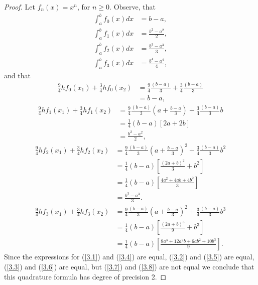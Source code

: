 \documentclass[8pt]{article}
\theoremstyle{definition}
\begin{document}
\begin{proof}
Let $f_n (x) = x^n$, for $n \geq 0$. Observe, that 
\begin{align}
\int_{a}^{b} f_0 (x) dx &= b - a, \label{3.1} \\
\int_{a}^{b} f_1 (x) dx &= \frac{b^2 - a^2}{2}, \label{3.2} \\
\int_{a}^{b} f_2 (x) dx &= \frac{b^3 - a^3}{3}, \label{3.3} \\
\int_{a}^{b} f_3 (x) dx &= \frac{b^4 - a^4}{4}, \label{3.7}
\end{align}
and that
\begin{align}
\nonumber \frac{9}{4} h f_0(x_1) + \frac{3}{4} h f_0(x_2) &= \frac{9}{4} \frac{(b - a)}{3} + \frac{3}{4} \frac{(b - a)}{3} \\
&= b - a, \label{3.4}
\end{align}
\begin{align}
\nonumber \frac{9}{4} h f_1(x_1) + \frac{3}{4} h f_1(x_2) &= \frac{9}{4} \frac{(b - a)}{3} \left( a + \frac{b - a}{3} \right) + \frac{3}{4} \frac{(b - a)}{3} b \\
\nonumber &= \frac{1}{4} (b - a) \left[ 2a + 2b \right] \\
&= \frac{b^2 - a^2}{2}, \label{3.5}
\end{align}
\begin{align}
\nonumber \frac{9}{4} h f_2(x_1) + \frac{3}{4} h f_2(x_2) &= \frac{9}{4} \frac{(b - a)}{3} \left( a + \frac{b - a}{3} \right)^2 + \frac{3}{4} \frac{(b - a)}{3} b^2 \\
\nonumber &= \frac{1}{4} (b - a) \left[ \frac{(2a + b)^2}{3} + b^2 \right] \\
\nonumber &= \frac{1}{4} (b - a) \left[ \frac{4 a^2 + 4ab + 4b^2}{3} \right] \\
&= \frac{b^3 - a^3}{3}. \label{3.6}
\end{align}
\begin{align}
\nonumber \frac{9}{4} h f_3(x_1) + \frac{3}{4} h f_3(x_2) &= \frac{9}{4} \frac{(b - a)}{3} \left( a + \frac{b - a}{3} \right)^2 + \frac{3}{4} \frac{(b - a)}{3} b^3 \\
\nonumber &= \frac{1}{4} (b - a) \left[ \frac{(2a + b)^3}{9} + b^3 \right] \\
&= \frac{1}{4} (b - a) \left[ \frac{8 a^3 + 12 a^2 b + 6 a b^2 + 10 b^3}{9} \right]. \label{3.8}
\end{align}
Since the expressions for (\ref{3.1}) and (\ref{3.4}) are equal, (\ref{3.2}) and (\ref{3.5}) are equal, (\ref{3.3}) and (\ref{3.6}) are equal, but (\ref{3.7}) and (\ref{3.8}) are not equal we conclude that this quadrature formula has degree of precision 2.
\end{proof}
\end{document}

